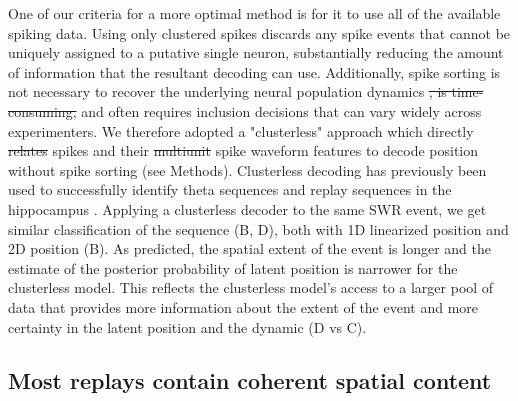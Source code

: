 \documentclass[9pt,lineno]{elife}
\providecommand{\DIFadd}[1]{{\protect\color{blue}\uwave{#1}}} %
\providecommand{\DIFdel}[1]{{\protect\color{red}\sout{#1}}}                      %
\providecommand{\DIFaddbegin}{} %
\providecommand{\DIFaddend}{} %
\providecommand{\DIFdelbegin}{} %
\providecommand{\DIFdelend}{} %
\newcommand{\DIFscaledelfig}{0.5}
\newlength{\DIFdelgraphicswidth} %
\newlength{\DIFdelgraphicsheight} %
\newcommand{\DIFaddincludegraphics}[2][]{{\color{blue}\fbox{\DIFOincludegraphics[#1]{#2}}}} %
\newcommand{\DIFdelincludegraphics}[2][]{%
\sbox{\DIFdelgraphicsbox}{\DIFOincludegraphics[#1]{#2}}%
\settoboxwidth{\DIFdelgraphicswidth}{\DIFdelgraphicsbox} %
\settoboxtotalheight{\DIFdelgraphicsheight}{\DIFdelgraphicsbox} %
\scalebox{\DIFscaledelfig}{%
\parbox[b]{\DIFdelgraphicswidth}{\usebox{\DIFdelgraphicsbox}\\[-\baselineskip] \rule{\DIFdelgraphicswidth}{0em}}\llap{\resizebox{\DIFdelgraphicswidth}{\DIFdelgraphicsheight}{%
\setlength{\unitlength}{\DIFdelgraphicswidth}%
\begin{picture}(1,1)%
\thicklines\linethickness{2pt} %
{\color[rgb]{1,0,0}\put(0,0){\framebox(1,1){}}}%
{\color[rgb]{1,0,0}\put(0,0){\line( 1,1){1}}}%
{\color[rgb]{1,0,0}\put(0,1){\line(1,-1){1}}}%
\end{picture}%
}\hspace*{3pt}}} %
} %
\DeclareRobustCommand{\DIFaddbegin}{\DIFOaddbegin \let\includegraphics\DIFaddincludegraphics} %
\DeclareRobustCommand{\DIFaddend}{\DIFOaddend \let\includegraphics\DIFOincludegraphics} %
\DeclareRobustCommand{\DIFdelbegin}{\DIFOdelbegin \let\includegraphics\DIFdelincludegraphics} %
\DeclareRobustCommand{\DIFdelend}{\DIFOaddend \let\includegraphics\DIFOincludegraphics} %
\begin{document}
One of our criteria for a more optimal method is for it to use all of the available spiking data. Using only clustered spikes discards any spike events that cannot be uniquely assigned to a putative single neuron, substantially reducing the amount of information that the resultant decoding can use. Additionally, spike sorting is not necessary to recover the underlying neural population dynamics \citep{TrautmannAccurateEstimationNeural2019} \DIFdelbegin \DIFdel{, is time-consuming, }\DIFdelend and often requires inclusion decisions that can vary widely across experimenters. We therefore adopted a "clusterless" approach which directly \DIFdelbegin \DIFdel{relates }\DIFdelend \DIFaddbegin \DIFadd{uses multiunit }\DIFaddend spikes and their \DIFdelbegin \DIFdel{multiunit }\DIFdelend spike waveform features to decode position without spike sorting (see Methods). Clusterless decoding has previously been used to successfully identify theta sequences and replay sequences in the hippocampus \citep{KloostermanBayesiandecodingusing2014, ChenTransductiveneuraldecoding2012,DengRapidclassificationhippocampal2016, KayConstantSubsecondCycling2020}. Applying a clusterless decoder to the same SWR event, we get similar classification of the sequence (B, D), both with 1D linearized position and 2D position (B). As predicted, the spatial extent of the event is longer and the estimate of the posterior probability of latent position is narrower for the clusterless model. This reflects the clusterless model's access to a larger pool of data that provides more information about the extent of the event and more certainty in the latent position and the dynamic (D vs C).

\subsection*{Most replays contain coherent spatial content}
\DIFdelbegin %
\end{document}
